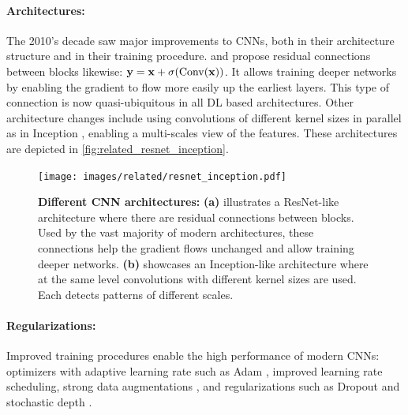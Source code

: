 \paragraph{Architectures:}The 2010's decade saw major improvements to \acp{CNN}, both in their
architecture structure and in their training procedure. \cite{srivastava2015highwaynet} and
\cite{he2016resnet} propose residual connections between blocks likewise: $\mathbf{y} = \mathbf{x} +
      \sigma(\operatorname{Conv}(\mathbf{x}))$. It allows training deeper networks by enabling the gradient to
flow more easily up the earliest layers. This type of connection is now quasi-ubiquitous in all
\ac{DL} based architectures. Other architecture changes include using convolutions of different
kernel sizes in parallel as in Inception \citep{szegedy2015inception}, enabling a multi-scales view
of the features. These architectures are depicted in \autoref{fig:related_resnet_inception}.

\begin{figure}[tb]
      \begin{center}
            \texttt{[image: images/related/resnet\_inception.pdf]}
      \end{center}
      \caption{\textbf{Different CNN architectures:} \textbf{(a)} illustrates a ResNet-like
            architecture where there are residual connections between blocks. Used by the vast
            majority of modern architectures, these connections help the gradient flows unchanged
            and allow training deeper networks. \textbf{(b)} showcases an Inception-like
            architecture where at the same level convolutions with different kernel sizes are used.
            Each detects patterns of different scales.}
      \label{fig:related_resnet_inception}
\end{figure}

\paragraph{Regularizations:} Improved training procedures \citep{wightman2019resnetstrikesback}
enable the high performance of modern \acp{CNN}: optimizers with adaptive learning rate such as Adam
\citep{kingma2014adam}, improved learning rate scheduling, strong data augmentations
\citep{muller2021trivialaugment,hingyi2018mixup,zhong2017erasing}, and regularizations such as
Dropout \citep{gal2016dropout} and stochastic depth \citep{gao2016stochasticdepth}.

